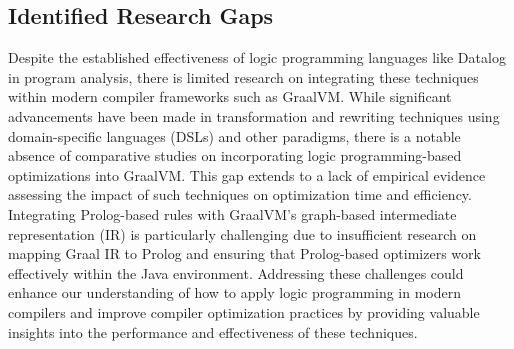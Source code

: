 \subsection{Identified Research Gaps}
Despite the established effectiveness of logic programming languages like Datalog in program analysis, there is limited research on integrating these techniques within modern compiler frameworks such as GraalVM. While significant advancements have been made in transformation and rewriting techniques using domain-specific languages (DSLs) and other paradigms, there is a notable absence of comparative studies on incorporating logic programming-based optimizations into GraalVM. This gap extends to a lack of empirical evidence assessing the impact of such techniques on optimization time and efficiency. Integrating Prolog-based rules with GraalVM’s graph-based intermediate representation (IR) is particularly challenging due to insufficient research on mapping Graal IR to Prolog and ensuring that Prolog-based optimizers work effectively within the Java environment. Addressing these challenges could enhance our understanding of how to apply logic programming in modern compilers and improve compiler optimization practices by providing valuable insights into the performance and effectiveness of these techniques.
